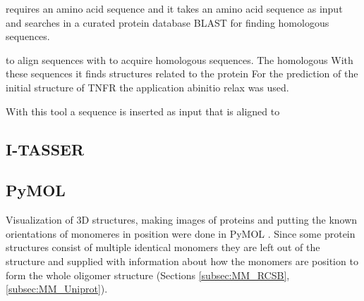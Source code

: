 requires an amino acid sequence and  it takes an amino acid sequence as input and searches in a curated protein database BLAST for finding homologous sequences. 


to align sequences with to acquire homologous sequences.  The homologous With these sequences it finds structures related to the protein
For the prediction of the initial structure of TNFR the application abinitio relax was used. 

With this tool a sequence is inserted as input that is aligned to 
 


\subsection{I-TASSER}
\label{subsec:MM_I_TASSER}

\subsection{PyMOL}
Visualization of 3D structures, making images of proteins and putting the known orientations of monomeres in position  were done in PyMOL \cite{}.
Since some protein structures consist of multiple identical monomers they are left out of the structure and supplied with information about how the monomers are position to form the whole oligomer structure (Sections \ref{subsec:MM_RCSB}, \ref{subsec:MM_Uniprot}).

